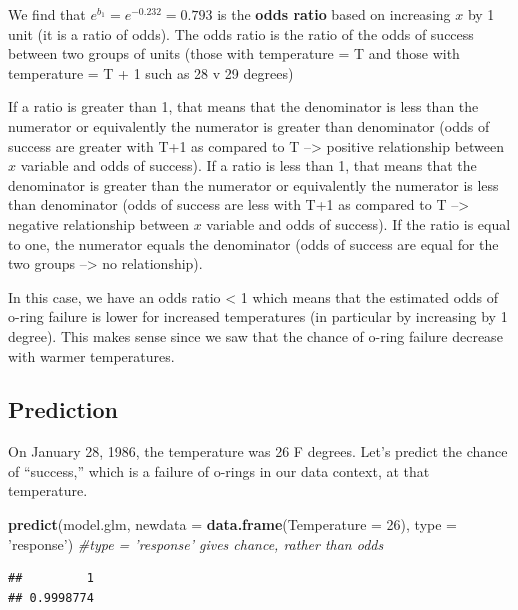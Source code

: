 \documentclass[]{book}
\newenvironment{Shaded}{\begin{snugshade}}{\end{snugshade}}
\newcommand{\CommentTok}[1]{\textcolor[rgb]{0.56,0.35,0.01}{\textit{#1}}}
\newcommand{\DataTypeTok}[1]{\textcolor[rgb]{0.13,0.29,0.53}{#1}}
\newcommand{\DecValTok}[1]{\textcolor[rgb]{0.00,0.00,0.81}{#1}}
\newcommand{\KeywordTok}[1]{\textcolor[rgb]{0.13,0.29,0.53}{\textbf{#1}}}
\newcommand{\NormalTok}[1]{#1}
\newcommand{\StringTok}[1]{\textcolor[rgb]{0.31,0.60,0.02}{#1}}
\begin{document}
We find that \(e^{b_1} = e^{-0.232} = 0.793\) is the \textbf{odds ratio} based on increasing \(x\) by 1 unit (it is a ratio of odds). The odds ratio is the ratio of the odds of success between two groups of units (those with temperature = T and those with temperature = T + 1 such as 28 v 29 degrees)

If a ratio is greater than 1, that means that the denominator is less than the numerator or equivalently the numerator is greater than denominator (odds of success are greater with T+1 as compared to T --\textgreater{} positive relationship between \(x\) variable and odds of success). If a ratio is less than 1, that means that the denominator is greater than the numerator or equivalently the numerator is less than denominator (odds of success are less with T+1 as compared to T --\textgreater{} negative relationship between \(x\) variable and odds of success). If the ratio is equal to one, the numerator equals the denominator (odds of success are equal for the two groups --\textgreater{} no relationship).

In this case, we have an odds ratio \textless{} 1 which means that the estimated odds of o-ring failure is lower for increased temperatures (in particular by increasing by 1 degree). This makes sense since we saw that the chance of o-ring failure decrease with warmer temperatures.

\hypertarget{prediction-1}{%
\subsection{Prediction}\label{prediction-1}}

On January 28, 1986, the temperature was 26 F degrees. Let's predict the chance of ``success,'' which is a failure of o-rings in our data context, at that temperature.

\begin{Shaded}
\begin{Highlighting}[]
\KeywordTok{predict}\NormalTok{(model.glm, }\DataTypeTok{newdata =} \KeywordTok{data.frame}\NormalTok{(}\DataTypeTok{Temperature =} \DecValTok{26}\NormalTok{), }\DataTypeTok{type =} \StringTok{'response'}\NormalTok{) }\CommentTok{#type = 'response' gives chance, rather than odds}
\end{Highlighting}
\end{Shaded}

\begin{verbatim}
##         1 
## 0.9998774
\end{verbatim}
\end{document}
